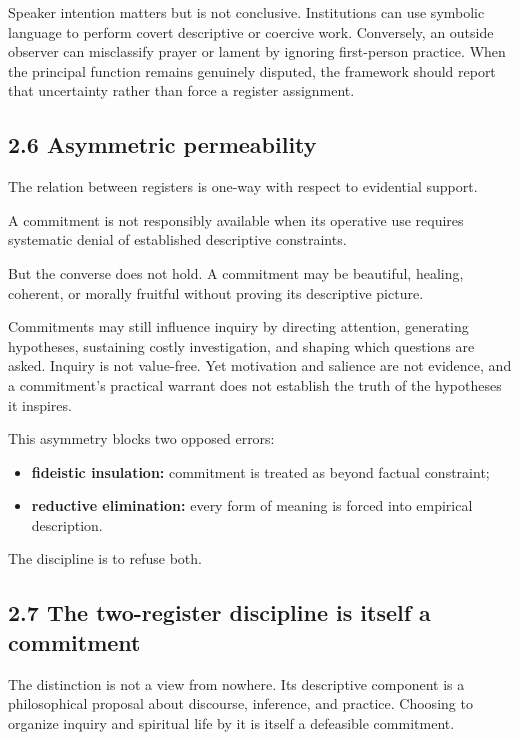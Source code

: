 \documentclass[
  11pt,
]{article}
\providecommand{\tightlist}{%
  \setlength{\itemsep}{0pt}\setlength{\parskip}{0pt}}
\begin{document}
Speaker intention matters but is not conclusive. Institutions can use
symbolic language to perform covert descriptive or coercive work.
Conversely, an outside observer can misclassify prayer or lament by
ignoring first-person practice. When the principal function remains
genuinely disputed, the framework should report that uncertainty rather
than force a register assignment.

\subsection{2.6 Asymmetric permeability}\label{asymmetric-permeability}

The relation between registers is one-way with respect to evidential
support.

A commitment is not responsibly available when its operative use
requires systematic denial of established descriptive constraints.

But the converse does not hold. A commitment may be beautiful, healing,
coherent, or morally fruitful without proving its descriptive picture.

Commitments may still influence inquiry by directing attention,
generating hypotheses, sustaining costly investigation, and shaping
which questions are asked. Inquiry is not value-free. Yet motivation and
salience are not evidence, and a commitment's practical warrant does not
establish the truth of the hypotheses it inspires.

This asymmetry blocks two opposed errors:

\begin{itemize}
\tightlist
\item
  \textbf{fideistic insulation:} commitment is treated as beyond factual
  constraint;
\item
  \textbf{reductive elimination:} every form of meaning is forced into
  empirical description.
\end{itemize}

The discipline is to refuse both.

\subsection{2.7 The two-register discipline is itself a
commitment}\label{the-two-register-discipline-is-itself-a-commitment}

The distinction is not a view from nowhere. Its descriptive component is
a philosophical proposal about discourse, inference, and practice.
Choosing to organize inquiry and spiritual life by it is itself a
defeasible commitment.
\end{document}
